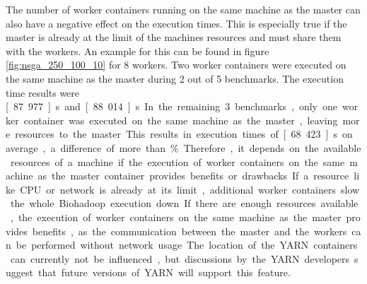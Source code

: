 
The number of worker containers running on the same machine as the master can also have a negative effect on the execution times. This is especially true if the master is already at the limit of the machines resources and must share them with the workers. An example for this can be found in figure \ref{fig:nsga_250_100_10} for 8 workers. Two worker containers were executed on the same machine as the master during 2 out of 5 benchmarks. The execution time results were \unit[87.977]{s} and \unit[88.014]{s}. In the remaining 3 benchmarks, only one worker container was executed on the same machine as the master, leaving more resources to the master. This results in execution times of \unit[68.423]{s} on average, a difference of more than \unit[20]{\%}.

Therefore, it depends on the available resources of a machine if the execution of worker containers on the same machine as the master container provides benefits or drawbacks. If a resource like CPU or network is already at its limit, additional worker containers slow the whole Biohadoop execution down. If there are enough resources available, the execution of worker containers on the same machine as the master provides benefits, as the communication between the master and the workers can be performed without network usage.

The location of the YARN containers can currently not be influenced, but discussions by the YARN developers suggest that future versions of YARN will support this feature.

